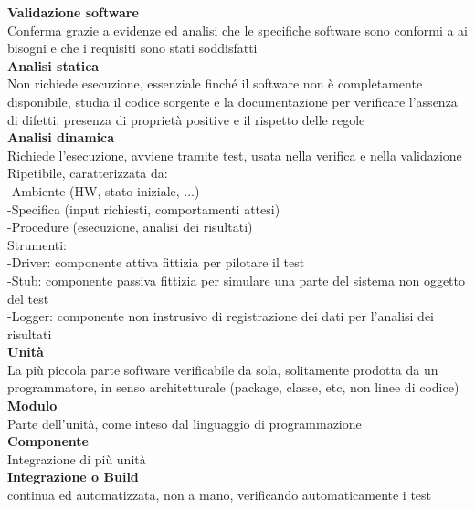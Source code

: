 \documentclass{article}
\begin{document}
				\textbf{Validazione software}\\
				Conferma grazie a evidenze ed analisi che le specifiche software sono conformi a ai bisogni e che i requisiti sono stati soddisfatti\\
				
				\textbf{Analisi statica}\\
				Non richiede esecuzione, essenziale finché il software non è completamente disponibile, studia il codice sorgente e la documentazione per verificare l'assenza di difetti, presenza di proprietà positive e il rispetto delle regole\\
				
				\textbf{Analisi dinamica}\\
				Richiede l'esecuzione, avviene tramite test, usata nella verifica e nella validazione\\
				Ripetibile, caratterizzata da:\\
				-Ambiente (HW, stato iniziale, ...)\\
				-Specifica (input richiesti, comportamenti attesi)\\
				-Procedure (esecuzione, analisi dei risultati)\\
				Strumenti:\\
				-Driver: componente attiva fittizia per pilotare il test\\
				-Stub: componente passiva fittizia per simulare una parte del sistema non oggetto del test\\
				-Logger: componente non instrusivo di registrazione dei dati per l'analisi dei risultati\\
				
				\textbf{Unità}\\
				La più piccola parte software verificabile da sola, solitamente prodotta da un programmatore, in senso architetturale (package, classe, etc, non linee di codice)\\
				
				\textbf{Modulo}\\
				Parte dell'unità, come inteso dal linguaggio di programmazione\\
				
				\textbf{Componente}\\
				Integrazione di più unità\\
				
				\textbf{Integrazione o Build}\\
				continua ed automatizzata, non a mano, verificando automaticamente i test\\
				
\end{document}
